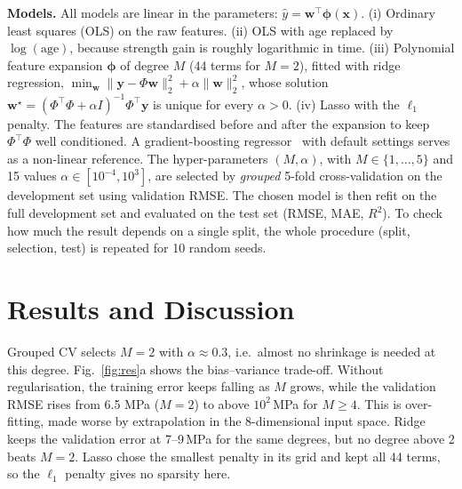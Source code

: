 \documentclass[10pt,a4paper]{article}
\begin{document}
\textbf{Models.} All models are linear in the parameters:
$\hat y = \mathbf w^\top\boldsymbol\phi(\mathbf x)$.
(i) Ordinary least squares (OLS) on the raw features.
(ii) OLS with age replaced by $\log(\text{age})$, because strength gain is roughly logarithmic in time.
(iii) Polynomial feature expansion $\boldsymbol\phi$ of degree $M$ (44 terms for $M=2$), fitted with
ridge regression, $\min_{\mathbf w}\lVert\mathbf y-\Phi\mathbf w\rVert_2^2+\alpha\lVert\mathbf w\rVert_2^2$,
whose solution $\mathbf w^\star=(\Phi^\top\Phi+\alpha I)^{-1}\Phi^\top\mathbf y$ is unique for every $\alpha>0$.
(iv) Lasso with the $\ell_1$ penalty.
The features are standardised before and after the expansion to keep $\Phi^\top\Phi$ well conditioned.
A gradient-boosting regressor~\cite{sklearn} with default settings serves as a non-linear reference.
The hyper-parameters $(M,\alpha)$, with $M\in\{1,\dots,5\}$ and 15 values $\alpha\in[10^{-4},10^{3}]$,
are selected by \emph{grouped} 5-fold cross-validation on the development set using validation RMSE.
The chosen model is then refit on the full development set and evaluated on the test set (RMSE, MAE, $R^2$).
To check how much the result depends on a single split, the whole procedure (split, selection, test)
is repeated for 10 random seeds.

\section{Results and Discussion}
Grouped CV selects $M=2$ with $\alpha\approx0.3$, i.e.\ almost no shrinkage is needed at this degree.
Fig.~\ref{fig:res}a shows the bias--variance trade-off. Without regularisation, the training error keeps
falling as $M$ grows, while the validation RMSE rises from 6.5 MPa ($M=2$) to above $10^2$\,MPa for $M\ge4$.
This is over-fitting, made worse by extrapolation in the 8-dimensional input space. Ridge keeps the
validation error at 7--9\,MPa for the same degrees, but no degree above 2 beats $M=2$.
Lasso chose the smallest penalty in its grid and kept all 44 terms, so the $\ell_1$ penalty gives no sparsity here.
\end{document}
